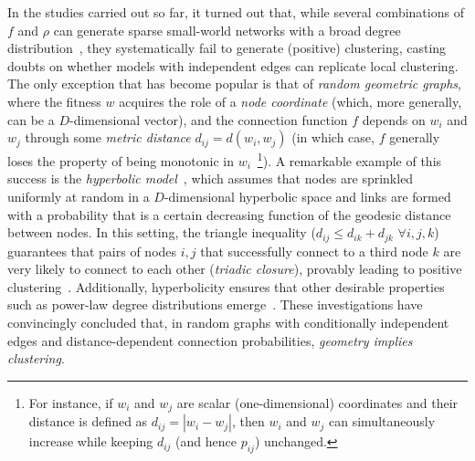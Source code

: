 \documentclass[ twocolumn,
 amsmath,amssymb,
 aps, pre, amsthm, amsfonts,
]{revtex4-2}
\begin{document}
In the studies carried out so far, it turned out that, while several combinations of $f$ and $\rho$ can generate sparse small-world networks with a broad degree distribution~\cite{caldarelli2002scale,van2016random, boguna2003class,squartini2017maximum}, they systematically fail to generate (positive) clustering, casting doubts on whether models with independent edges can replicate local clustering. 
The only exception that has become popular is that of \emph{random geometric graphs}, where the fitness $w$ acquires the role of a \emph{node coordinate} (which, more generally, can be a $D$-dimensional vector), and the connection function $f$ depends on $w_i$ and $w_j$ through some \emph{metric distance} $d_{ij}=d(w_i,w_j)$ (in which case, $f$ generally loses the property of being monotonic in $w_i$~\footnote{For instance, if $w_i$ and $w_j$ are scalar (one-dimensional) coordinates and their distance is defined as $d_{ij}=|w_i-w_j|$, then $w_i$ and $w_j$ can simultaneously increase while keeping $d_{ij}$ (and hence $p_{ij}$) unchanged.}).
A remarkable example of this success is the \emph{hyperbolic model}~\cite{krioukov2016clustering, aliakbarisani2025clustering, serrano2006clusteringI, serrano2006clusteringII, boguna2021network, newman2009random, krioukov2010hyperbolic, michielan2022detecting}, which assumes that nodes are sprinkled uniformly at random in a $D$-dimensional hyperbolic space and links are formed with a probability that is a certain decreasing function of the geodesic distance between nodes.
In this setting, the triangle inequality ($d_{ij}\le d_{ik}+d_{jk}$ $\forall i,j,k$) guarantees that pairs of nodes $i,j$ that successfully connect to a third node $k$ are very likely to connect to each other (\emph{triadic closure}), provably leading to positive clustering~\cite{allard2024geometric, candellero2014clustering}.
Additionally, hyperbolicity ensures that other desirable properties such as power-law degree distributions emerge~\cite{krioukov2010hyperbolic}.
These investigations have convincingly concluded that, in random graphs with conditionally independent edges and distance-dependent connection probabilities, {\em geometry implies clustering}.
\end{document}
